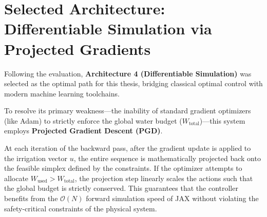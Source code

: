 \documentclass[11pt, a4paper]{article}
\begin{document}
\section{Selected Architecture: Differentiable Simulation via Projected Gradients}
\label{sec:selected}
Following the evaluation, \textbf{Architecture 4 (Differentiable Simulation)} was selected as the optimal path for this thesis, bridging classical optimal control with modern machine learning toolchains. 

To resolve its primary weakness—the inability of standard gradient optimizers (like Adam) to strictly enforce the global water budget ($W_{\text{total}}$)—this system employs \textbf{Projected Gradient Descent (PGD)}. 

At each iteration of the backward pass, after the gradient update is applied to the irrigation vector $u$, the entire sequence is mathematically projected back onto the feasible simplex defined by the constraints. If the optimizer attempts to allocate $W_{\text{used}} > W_{\text{total}}$, the projection step linearly scales the actions such that the global budget is strictly conserved. This guarantees that the controller benefits from the $\mathcal{O}(N)$ forward simulation speed of JAX without violating the safety-critical constraints of the physical system.
\end{document}

